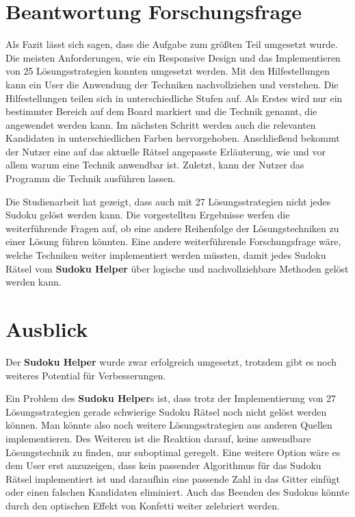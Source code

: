 \section{Beantwortung Forschungsfrage}

Als Fazit lässt sich sagen, dass die Aufgabe zum größten Teil umgesetzt wurde. Die meisten Anforderungen, wie ein Responsive Design und das Implementieren von 25 Lösungsstrategien konnten umgesetzt werden. Mit den Hilfestellungen kann ein User die Anwendung der Techniken nachvollziehen und verstehen. Die Hilfestellungen teilen sich in unterschiedliche Stufen auf. Als Erstes wird nur ein bestimmter Bereich auf dem Board markiert und die Technik genannt, die angewendet werden kann. Im nächsten Schritt werden auch die relevanten Kandidaten in unterschiedlichen Farben hervorgehoben. Anschließend bekommt der Nutzer eine auf das aktuelle Rätsel angepasste Erläuterung, wie und vor allem warum eine Technik anwendbar ist. Zuletzt, kann der Nutzer das Programm die Technik ausführen lassen.

Die Studienarbeit hat gezeigt, dass auch mit 27 Lösungsstrategien nicht jedes Sudoku gelöst werden kann. Die vorgestellten Ergebnisse werfen die weiterführende Fragen auf, ob eine andere Reihenfolge der Lösungstechniken zu einer Lösung führen könnten. Eine andere weiterführende Forschungsfrage wäre, welche Techniken weiter implementiert werden müssten, damit jedes Sudoku Rätsel vom \textbf{Sudoku Helper} über logische und nachvollziehbare Methoden gelöst werden kann.

\section{Ausblick}

Der \textbf{Sudoku Helper} wurde zwar erfolgreich umgesetzt, trotzdem gibt es noch weiteres Potential für Verbesserungen.

Ein Problem des \textbf{Sudoku Helper}s ist, dass trotz der Implementierung von 27 Lösungsstrategien gerade schwierige Sudoku Rätsel noch nicht gelöst werden können. Man könnte also noch weitere Lösungsstrategien aus anderen Quellen implementieren. Des Weiteren ist die Reaktion darauf, keine anwendbare Lösungstechnik zu finden, nur suboptimal geregelt. Eine weitere Option wäre es dem User erst anzuzeigen, dass kein passender Algorithmus für das Sudoku Rätsel implementiert ist und daraufhin eine passende Zahl in das Gitter einfügt oder einen falschen Kandidaten eliminiert. Auch das Beenden des Sudokus könnte durch den optischen Effekt von Konfetti weiter zelebriert werden.

